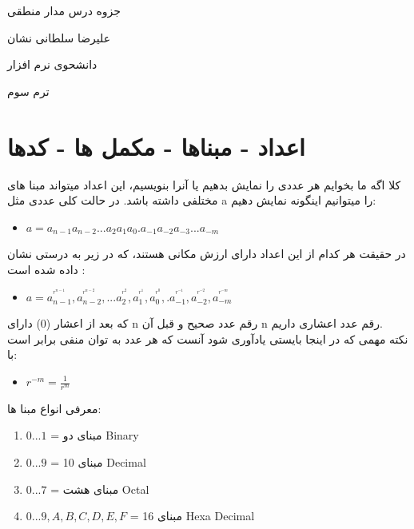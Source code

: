 \documentclass[pt, a5paper]{article}
\begin{document}
\centerline{جزوه درس مدار منطقی}
\centerline{علیرضا سلطانی نشان}
\centerline{دانشحوی نرم افزار}
\centerline{ترم سوم}
\tableofcontents


\section{اعداد - مبناها - مکمل ها - کدها}

کلا اگه ما بخوایم هر عددی را نمایش بدهیم یا آنرا بنویسیم، این اعداد میتواند مبنا های مختلفی داشته باشد. در حالت کلی عددی مثل a را میتوانیم اینگونه نمایش دهیم:\\

\begin{itemize}\centering
	\item
		$a = a_{n-1} a_{n-2} ... a_2 a_1 a_{0}.a_{-1}a_{-2}a_{-3}...a_{-m}$
\end{itemize}


در حقیقت هر کدام از این اعداد دارای ارزش مکانی هستند، که در زیر به درستی نشان داده شده است :\newline

\begin{itemize}\centering
\item
$a = a_{n-1}^{^{r^{n-1}}},  a_{n-2} ^{^{r^{n-2}}},  
...  a_2 ^{^{r^{2}}}, a_1^{^{r^{1}}},  a_0^{^{r^{0}}}, . 
a_{-1}^{^{r^{-1}}},  a_{-2}^{^{r^{-2}}},  a_{-m}^{^{r^{-m}}}$
\end{itemize}


که بعد از اعشار (0) دارای n رقم عدد صحیح و قبل آن n رقم عدد اعشاری داریم.\\
نکته مهمی که در اینجا بایستی یادآوری شود آنست که هر عدد به توان منفی برابر است با:\newline

\begin{itemize}\centering
	\item
		$r^{-m} = \frac{1}{r^{m}}$
\end{itemize}



معرفی انواع مبنا ها:\newline
\begin{enumerate}\raggedright
	\item
	 $ 0...1 $ = {مبنای دو Binary}		
	\item
		 $ 0...9 $ = {مبنای 10 Decimal}		
	\item
	 $ 0...7 $ = {مبنای هشت Octal}		
	\item
	 $  0 ... 9 , A, B, C, D, E, F$ = {مبنای 16 Hexa Decimal}	
\end{enumerate}
\end{document}
